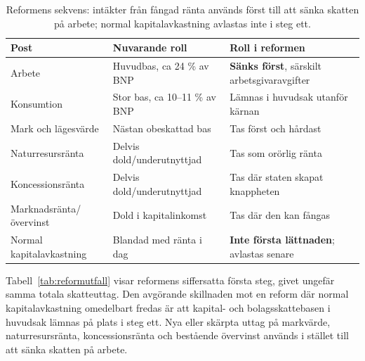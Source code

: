 \documentclass[11pt]{article}
\begin{document}
\begin{table}[h]
\small
\centering
\begin{tabular}{lll}
\hline
\textbf{Post} & \textbf{Nuvarande roll} & \textbf{Roll i reformen} \\
\hline
Arbete & Huvudbas, ca 24 \% av BNP & \textbf{Sänks först}, särskilt arbetsgivaravgifter \\
Konsumtion & Stor bas, ca 10--11 \% av BNP & Lämnas i huvudsak utanför kärnan \\
Mark och lägesvärde & Nästan obeskattad bas & Tas först och hårdast \\
Naturresursränta & Delvis dold/underutnyttjad & Tas som orörlig ränta \\
Koncessionsränta & Delvis dold/underutnyttjad & Tas där staten skapat knappheten \\
Marknadsränta/övervinst & Dold i kapitalinkomst & Tas där den kan fångas \\
Normal kapitalavkastning & Blandad med ränta i dag & \textbf{Inte första lättnaden}; avlastas senare \\
\hline
\end{tabular}
\caption{Reformens sekvens: intäkter från fångad ränta används först till att sänka skatten på arbete; normal kapitalavkastning avlastas inte i steg ett.}
\label{tab:ordning}
\end{table}

Tabell~\ref{tab:reformutfall} visar reformens siffersatta första steg, givet ungefär samma totala skatteuttag. Den avgörande skillnaden mot en reform där normal kapitalavkastning omedelbart fredas är att kapital- och bolagsskattebasen i huvudsak lämnas på plats i steg ett. Nya eller skärpta uttag på markvärde, naturresursränta, koncessionsränta och bestående övervinst används i stället till att sänka skatten på arbete.
\end{document}
